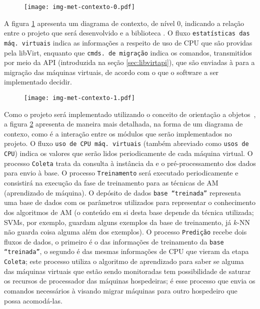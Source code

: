 \begin{figure}[htp]
\centering
\texttt{[image: img-met-contexto-0.pdf]}
\label{fig:contexto0}
\end{figure}

A figura \ref{fig:contexto0} apresenta um diagrama de contexto, de nível 0,
indicando a relação entre o projeto que será desenvolvido e a biblioteca
\libvirt{}. O fluxo \texttt{estatísticas das máq. virtuais} indica as
informações a respeito de uso de CPU que são providas pela libVirt,
enquanto que \texttt{cmds. de migração} indica os comandos, transmitidos
por meio da API (introduzida na seção \ref{sec:libvirtapi}), que são enviadas
à \libvirt{} para a migração das máquinas virtuais, de acordo com o que o
software a ser implementado decidir.

\begin{figure}[htp]
\centering
\texttt{[image: img-met-contexto-1.pdf]}
\label{fig:contexto1}
\end{figure}

Como o projeto será implementado utilizando o conceito de orientação a
objetos~\cite{ricarte2001programacao}, a figura \ref{fig:contexto1} apresenta
de maneira mais detalhada, na forma de um diagrama de contexo, como é a
interação entre os módulos que serão implementados no projeto. O fluxo
\texttt{uso de CPU máq. virtuais} (também abreviado como \texttt{usos de CPU})
indica os valores que serão lidos periodicamente de cada máquina virtual.  O
processo \texttt{Coleta} trata da consulta à instância da \libvirt{} e o
pré-processamento dos dados para envio à base. O processo \texttt{Treinamento}
será executado periodicamente e consistirá na execução da fase de treinamento
para as técnicas de AM (aprendizado de máquina). O depósito de dados
\texttt{base ``treinada''} representa uma base de dados com os parâmetros
utilizados para representar o conhecimento dos algoritmos de AM (o conteúdo em
si desta base depende da técnica utilizada; SVMs, por exemplo, guardam alguns
exemplos da base de treinamento, já $k$-NN não guarda coisa alguma além dos
exemplos). O processo \texttt{Predição} recebe dois fluxos de dados, o primeiro
é o das informações de treinamento da \texttt{base ``treinada''}, o segundo é
das mesmas informações de CPU que vieram da etapa \texttt{Coleta}; este
processo utiliza o algoritmo de aprendizado para saber se alguma das máquinas
virtuais que estão sendo monitoradas tem possibilidade de saturar os recursos
de processador das máquinas hospedeiras; é esse processo que envia os comandos
necessários à \libvirt{} visando migrar máquinas para outro hospedeiro que
possa acomodá-las.


